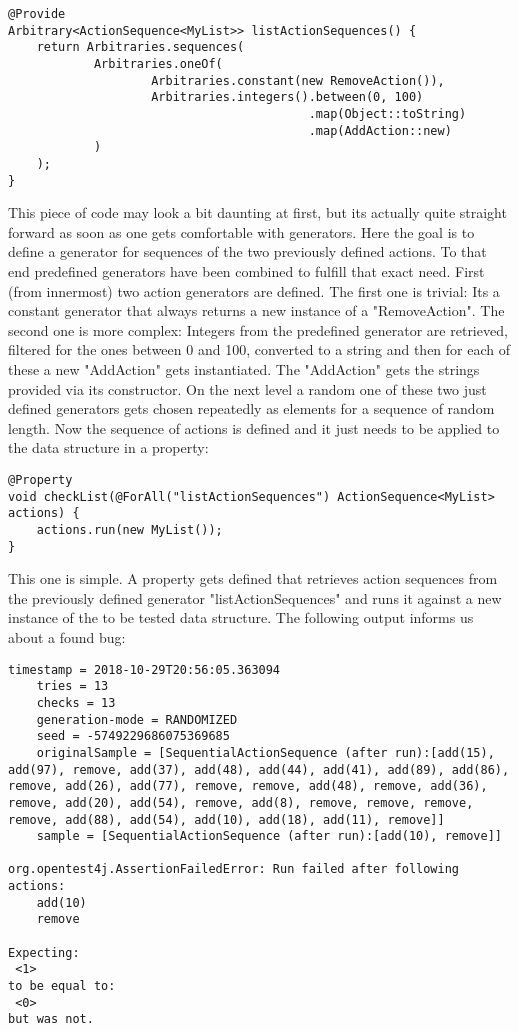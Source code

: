 \documentclass[a4paper, 12pt]{article} %
\begin{document}
\begin{verbatim}
@Provide
Arbitrary<ActionSequence<MyList>> listActionSequences() {
    return Arbitraries.sequences(
            Arbitraries.oneOf(
                    Arbitraries.constant(new RemoveAction()),
                    Arbitraries.integers().between(0, 100)
                                          .map(Object::toString)
                                          .map(AddAction::new)
            )
    );
}
\end{verbatim} 

This piece of code may look a bit daunting at first, but its actually quite straight forward as soon as one gets comfortable with generators. Here the goal is to define a generator for sequences of the two previously defined actions. To that end predefined generators have been combined to fulfill that exact need. First (from innermost) two action generators are defined. The first one is trivial: Its a constant generator that always returns a new instance of a "RemoveAction". The second one is more complex: Integers from the predefined generator are retrieved, filtered for the ones between 0 and 100, converted to a string and then for each of these a new "AddAction" gets instantiated. The "AddAction" gets the strings provided via its constructor. On the next level a random one of these two just defined generators gets chosen repeatedly as elements for a sequence of random length. Now the sequence of actions is defined and it just needs to be applied to the data structure in a property:

\begin{verbatim}
@Property
void checkList(@ForAll("listActionSequences") ActionSequence<MyList> actions) {
    actions.run(new MyList());
}
\end{verbatim} 

This one is simple. A property gets defined that retrieves action sequences from the previously defined generator "listActionSequences" and runs it against a new instance of the to be tested data structure. The following output informs us about a found bug:

\begin{verbatim}
timestamp = 2018-10-29T20:56:05.363094
    tries = 13
    checks = 13
    generation-mode = RANDOMIZED
    seed = -5749229686075369685
    originalSample = [SequentialActionSequence (after run):[add(15), add(97), remove, add(37), add(48), add(44), add(41), add(89), add(86), remove, add(26), add(77), remove, remove, add(48), remove, add(36), remove, add(20), add(54), remove, add(8), remove, remove, remove, remove, add(88), add(54), add(10), add(18), add(11), remove]]
    sample = [SequentialActionSequence (after run):[add(10), remove]]

org.opentest4j.AssertionFailedError: Run failed after following actions:
    add(10)
    remove

Expecting:
 <1>
to be equal to:
 <0>
but was not.
\end{verbatim}
\end{document}
